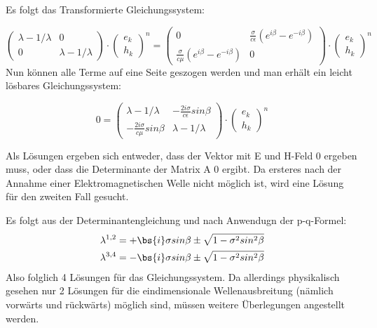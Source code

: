Es folgt das Transformierte Gleichungssystem:
\par
\begin{equation*}
	\begin{pmatrix} 
		\lambda - 1/\lambda & 0\\
		0 & \lambda - 1/\lambda
	\end{pmatrix}
	\cdot
	\begin{pmatrix}
		e_k \\
		h_k
	\end{pmatrix}^n
	=
	\begin{pmatrix}
		0 & \frac{\sigma}{c\epsilon}(e^{i\beta}-e^{-i\beta}) \\
		\frac{\sigma}{c\mu}(e^{i\beta}-e^{-i\beta}) & 0
	\end{pmatrix}
	\cdot
	\begin{pmatrix}
		e_k \\
		h_k
	\end{pmatrix}^n
\end{equation*}
Nun k\"onnen alle Terme auf eine Seite geszogen werden und man erh\"alt ein leicht l\"osbares Gleichungssystem:
\par
\begin{equation*}
	0
	=
	\begin{pmatrix} 
		\lambda - 1/\lambda & -\frac{2i\sigma}{c\epsilon}sin\beta\\
		-\frac{2i\sigma}{c\mu}sin\beta & \lambda - 1/\lambda
	\end{pmatrix}
	\cdot
	\begin{pmatrix}
		e_k \\
		h_k
	\end{pmatrix}^n
\end{equation*}
\par
\vspace{-1.6em}
\par
Als L\"osungen ergeben sich entweder, dass der Vektor mit E und H-Feld 0 ergeben muss, oder dass die Determinante der Matrix A 0 ergibt. Da ersteres nach der Annahme einer Elektromagnetischen Welle nicht m\"oglich ist, wird eine L\"osung f\"ur den zweiten Fall gesucht.
\par
Es folgt aus der Determinantengleichung und nach Anwendugn der p-q-Formel:
\begin{align*}
	\lambda^{1,2} &= +\bs{i}\sigma sin\beta \pm \sqrt{1-\sigma^2sin^2\beta} \\
	\lambda^{3,4} &= -\bs{i}\sigma sin\beta \pm \sqrt{1-\sigma^2sin^2\beta}
\end{align*}
Also folglich 4 L\"osungen f\"ur das Gleichungssystem. Da allerdings physikalisch gesehen nur 2 L\"osungen f\"ur die eindimensionale Wellenausbreitung (n\"amlich vorw\"arts und r\"uckw\"arts) m\"oglich sind, m\"ussen weitere \"Uberlegungen angestellt werden.

